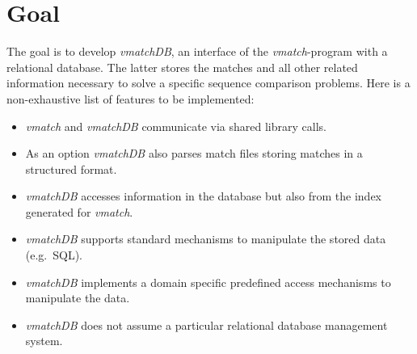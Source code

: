 \documentclass[12pt]{article}
\newcommand{\Vmatch}{\emph{vmatch}\xspace}
\newcommand{\VmatchDB}{\emph{vmatchDB}\xspace}
\begin{document}
\section{Goal}
The goal is to develop \VmatchDB, an interface of the \Vmatch-program with a 
relational database. The latter stores the matches and all other related 
information necessary to solve a specific sequence comparison problems. 
Here is a non-exhaustive list of features to be implemented:
\begin{itemize}
\item
\Vmatch and \VmatchDB communicate via shared library calls. 
\item
As an option \VmatchDB also parses match files storing matches in a 
structured format.
\item
\VmatchDB accesses information in the database but also from the 
index generated for \Vmatch.
\item
\VmatchDB supports standard mechanisms to manipulate the stored data (e.g.\
SQL).
\item
\VmatchDB implements a domain specific predefined access mechanisms
to manipulate the data.
\item
\VmatchDB does not assume a particular relational database management
system.
\end{itemize}


\end{document}
